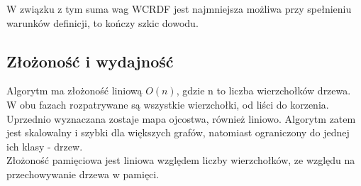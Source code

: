 W związku z tym suma wag WCRDF jest najmniejsza możliwa przy spełnieniu warunków definicji, to kończy szkic dowodu.

\subsection{Złożoność i wydajność}
Algorytm ma złożoność liniową $O(n)$, gdzie n to liczba wierzchołków drzewa. W obu fazach rozpatrywane są wszystkie wierzchołki, od liści do korzenia. Uprzednio wyznaczana zostaje mapa ojcostwa, również liniowo. Algorytm zatem jest skalowalny i szybki dla większych grafów, natomiast ograniczony do jednej ich klasy - drzew.\\ Złożoność pamięciowa jest liniowa względem liczby wierzchołków, ze względu na przechowywanie drzewa w pamięci.

